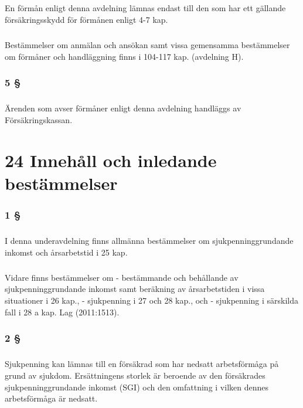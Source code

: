 \documentclass[a4paper,notitlepage,openany,10pt]{book}
\begin{document}
\paragraph*{}
En förmån enligt denna avdelning lämnas endast till den som har ett gällande försäkringsskydd för förmånen enligt 4-7 kap.
\paragraph*{}
Bestämmelser om anmälan och ansökan samt vissa gemensamma bestämmelser om förmåner och handläggning finns i 104-117 kap. (avdelning H).
\subsection*{5 §}
\paragraph*{}
Ärenden som avser förmåner enligt denna avdelning handläggs av Försäkringskassan.
\chapter*{24 Innehåll och inledande bestämmelser}
\subsection*{1 §}
\paragraph*{}
I denna underavdelning finns allmänna bestämmelser om sjukpenninggrundande inkomst och årsarbetstid i 25 kap.
\paragraph*{}
Vidare finns bestämmelser om
\newline - bestämmande och behållande av sjukpenninggrundande inkomst samt beräkning av årsarbetstiden i vissa situationer i 26 kap.,
\newline - sjukpenning i 27 och 28 kap., och
\newline - sjukpenning i särskilda fall i 28 a kap.
Lag (2011:1513).
\subsection*{2 §}
\paragraph*{}
Sjukpenning kan lämnas till en försäkrad som har nedsatt arbetsförmåga på grund av sjukdom. Ersättningens storlek är beroende av den försäkrades sjukpenninggrundande inkomst (SGI) och den omfattning i vilken dennes arbetsförmåga är nedsatt.
\end{document}
